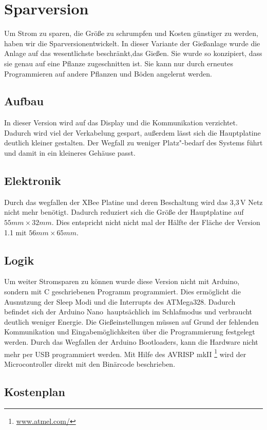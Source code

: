 
\section{Sparversion}
	Um Strom zu sparen, die Größe zu schrumpfen und Kosten günstiger zu werden, haben wir die \glqq Sparversion\grqq entwickelt.
	In dieser Variante der Gießanlage wurde die Anlage auf das wesentlichste beschränkt,das Gießen.
	Sie wurde so konzipiert, dass sie genau auf eine Pflanze zugeschnitten ist.
	Sie kann nur durch erneutes Programmieren auf andere Pflanzen und Böden angelernt werden. 	
		
	\subsection{Aufbau}
	In dieser Version wird auf das Display und die Kommunikation verzichtet.
	Dadurch wird viel der Verkabelung gespart, außerdem lässt sich die Hauptplatine deutlich kleiner gestalten.
	Der Wegfall zu weniger Platz"-bedarf des Systems führt und damit in ein kleineres Gehäuse passt.
		
	\subsection{Elektronik}
	Durch das wegfallen der XBee Platine und deren Beschaltung wird das 3,3\,V Netz nicht mehr benötigt.
	Dadurch reduziert sich die Größe der Hauptplatine auf \begin{math} 55 mm \times 32 mm \end{math}.
	Dies entspricht nicht nicht mal der Hälfte der Fläche der Version 1.1 mit \begin{math} 56 mm \times 65 mm \end{math}.
	
		
	\subsection{Logik}
	Um weiter Stromsparen zu können wurde diese Version nicht mit Arduino, sondern mit C geschriebenen Programm programmiert.
	Dies ermöglicht die Ausnutzung der Sleep Modi und die Interrupts des ATMega328. 
	Dadurch befindet sich der \glqq Arduino Nano\grqq \ hauptsächlich im Schlafmodus und verbraucht deutlich weniger Energie.
	Die Gießeinstellungen müssen auf Grund der fehlenden Kommunikation und Eingabemöglichkeiten über die Programmierung festgelegt werden.
	Durch das Wegfallen der Arduino Bootloaders, kann die Hardware nicht mehr per USB programmiert werden. 
	Mit Hilfe des AVRISP mkII \footnote{\href{http://www.atmel.com/tools/avrispmkii.aspx}{www.atmel.com/}} wird der Microcontroller direkt mit den Binärcode beschrieben.
	
	\subsection{Kostenplan}
